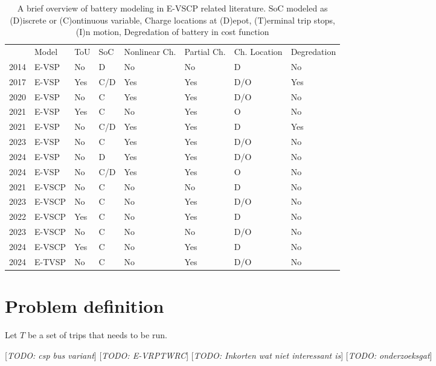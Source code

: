 \documentclass[ht]{article}
\newcommand{\todo}[1]{{\color{red}[\textit{TODO: #1}]}}
\begin{document}
\begin{table}[h]
  \centering
  \begin{tabular}{clllllll}
    \toprule
                                     & Model  & ToU & SoC & Nonlinear Ch. & Partial Ch. & Ch. Location & Degredation \\
    \cmidrule(lr){2-8}
    \cite{Li2014} 2014               & E-VSP  & No  & D   & No            & No          & D            & No          \\
    \cite{vanKootenNiekerk2017} 2017 & E-VSP  & Yes & C/D & Yes           & Yes         & D/O          & Yes         \\
    \cite{Olsen2020} 2020            & E-VSP  & No  & C   & Yes           & Yes         & D/O          & No          \\
    \cite{Jiang2021} 2021            & E-VSP  & Yes & C   & No            & Yes         & O            & No          \\
    \cite{Zhang2021} 2021                 & E-VSP  & No  & C/D & Yes           & Yes         & D            & Yes \\
    \cite{Parmentier2023} 2023       & E-VSP  & No  & C   & Yes           & Yes         & D/O          & No          \\
    \cite{deVos2024} 2024            & E-VSP  & No  & D   & Yes           & Yes         & D/O          & No          \\
    \cite{Pulyassary2024} 2024       & E-VSP  & No  & C/D & Yes           & Yes         & O            & No          \\
    \addlinespace[0.4em]
    \cite{Perumal2021} 2021          & E-VSCP & No  & C   & No            & No          & D            & No          \\
    \cite{Sistig2023} 2023           & E-VSCP & No  & C   & No            & Yes         & D/O          & No          \\
    \cite{Wang2022} 2022             & E-VSCP & Yes & C   & No            & Yes         & D            & No          \\
    \cite{Shen2023} 2023             & E-VSCP & No  & C   & No            & No          & D/O          & No          \\
    \cite{Cong2024} 2024             & E-VSCP & Yes & C   & No            & Yes         & D            & No          \\
    \addlinespace[0.4em]
    \cite{Stadnichuk2024} 2024       & E-TVSP & No  & C   & No            & Yes         & D/O          & No          \\
    \bottomrule
  \end{tabular}
  \caption{A brief overview of battery modeling in E-VSCP related literature. SoC modeled as (D)iscrete or (C)ontinuous variable, Charge locations at (D)epot, (T)erminal trip stops, (I)n motion, Degredation of battery in cost function}
  \label{tab:evscp-lit}
\end{table}

\section{Problem definition}
\label{sec:problem_def}
Let $T$ be a set of trips that needs to be run.


\todo{csp bus variant}
\todo{E-VRPTWRC}
\todo{Inkorten wat niet interessant is}
\todo{onderzoeksgat}
\printbibliography
\end{document}
